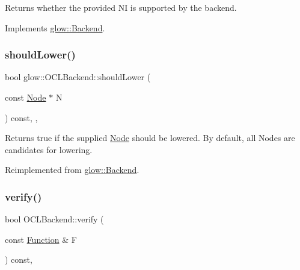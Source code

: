 \begin{DoxyReturn}{Returns}
whether the provided {\ttfamily NI} is supported by the backend. 
\end{DoxyReturn}


Implements \hyperlink{classglow_1_1_backend_a386f7e534956c47f8a6b1457d6e87c67}{glow\+::\+Backend}.

\mbox{\label{classglow_1_1_o_c_l_backend_afadf9ab6b9686d5227ed285cfd3b8db1}} 
\subsubsection{\texorpdfstring{should\+Lower()}{shouldLower()}}
{\footnotesize\ttfamily bool glow\+::\+O\+C\+L\+Backend\+::should\+Lower (\begin{DoxyParamCaption}\item[{const \hyperlink{classglow_1_1_node}{Node} $\ast$}]{N }\end{DoxyParamCaption}) const\hspace{0.3cm}{\ttfamily [inline]}, {\ttfamily [override]}, {\ttfamily [virtual]}}

\begin{DoxyReturn}{Returns}
true if the supplied \hyperlink{classglow_1_1_node}{Node}  should be lowered. By default, all Nodes are candidates for lowering. 
\end{DoxyReturn}


Reimplemented from \hyperlink{classglow_1_1_backend_aba5bec08f5e60626bcc5238f410d632a}{glow\+::\+Backend}.

\mbox{\label{classglow_1_1_o_c_l_backend_a4e7432c28997e04d398ab5310e7f64f0}} 
\subsubsection{\texorpdfstring{verify()}{verify()}\hspace{0.1cm}{\footnotesize\ttfamily [1/2]}}
{\footnotesize\ttfamily bool O\+C\+L\+Backend\+::verify (\begin{DoxyParamCaption}\item[{const \hyperlink{classglow_1_1_function}{Function} \&}]{F }\end{DoxyParamCaption}) const\hspace{0.3cm}{\ttfamily [override]}, {\ttfamily [virtual]}}


